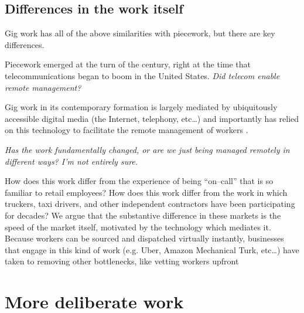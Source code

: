 \documentclass{sigchi}
\begin{document}
\subsection{Differences in the work itself}
Gig work has all of the above similarities with piecework,
but there are key differences.

Piecework emerged at the turn of the  century,
right at the time that telecommunications began to boom in the United States. %
\textit{Did telecom enable remote management?}

Gig work in its contemporary formation is largely mediated by
ubiquitously accessible digital media
(the Internet, telephony, etc\dots)
and importantly has relied on this technology to facilitate the remote management of workers
\cite{uberAlgorithm}.

\textit{Has the work fundamentally changed,
or are we just being managed remotely in different ways?
I'm not entirely sure.}

How does this work differ from the experience of being ``on--call'' that is so familiar to retail employees?
How does this work differ from the work in which truckers, taxi drivers, and other
independent contractors have been participating for decades?
We argue that the substantive difference in these markets is the speed of the market itself,
motivated by the technology which mediates it.
Because workers can be sourced and dispatched virtually instantly,
businesses that engage in this kind of work
(e.g. Uber, Amazon Mechanical Turk, etc\dots)
have taken to removing other bottlenecks,
like vetting workers upfront


\section{More deliberate work}

\balance{}
\printbibliography
\end{document}
